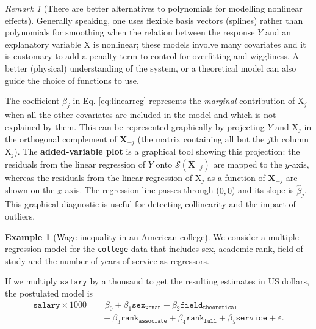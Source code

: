 \documentclass[
  11pt,
  letterpaper,
]{book}
\theoremstyle{definition}
\theoremstyle{definition}
\newtheorem{example}{Example}[chapter]
\theoremstyle{definition}
\theoremstyle{remark}
\newtheorem*{remark}{Remark}
\begin{document}
\begin{remark}[There are better alternatives to polynomials for modelling nonlinear effects]
{}Generally speaking, one uses flexible basis vectors (splines) rather than polynomials for smoothing when the relation between the response \(Y\) and an explanatory variable \(\mathrm{X}\) is nonlinear; these models involve many covariates and it is customary to add a penalty term to control for overfitting and wiggliness. A better (physical) understanding of the system, or a theoretical model can also guide the choice of functions to use.
\end{remark}

The coefficient \(\beta_j\) in Eq. \eqref{eq:linearreg} represents the \emph{marginal} contribution of \(\mathrm{X}_j\) when all the other covariates are included in the model and which is not explained by them. This can be represented graphically by projecting \(Y\) and \(\mathrm{X}_j\) in the orthogonal complement of \(\mathbf{X}_{-j}\) (the matrix containing all but the \(j\)th column \(\mathrm{X}_j\)). The \textbf{added-variable plot} is a graphical tool showing this projection: the residuals from the linear regression of \(Y\) onto \(\mathscr{S}(\mathbf{X}_{-j})\) are mapped to the \(y\)-axis, whereas the residuals from the linear regression of \(\mathrm{X}_j\) as a function of \(\mathbf{X}_{-j}\) are shown on the \(x\)-axis. The regression line passes through (\(0,0\)) and its slope is \(\hat{\beta}_j\). This graphical diagnostic is useful for detecting collinearity and the impact of outliers.

\begin{example}[Wage inequality in an American college]
\protect\hypertarget{exm:inequite-salariale}{}{\label{exm:inequite-salariale} {} }We consider a multiple regression model for the \texttt{college} data that includes sex, academic rank, field of study and the number of years of service as regressors.
\end{example}

If we multiply \(\texttt{salary}\) by a thousand to get the resulting estimates in US dollars, the postulated model is
\begin{align*}
\texttt{salary}\times 1000 &= \beta_0 + \beta_1 \texttt{sex}_{\texttt{woman}} +\beta_2 \texttt{field}_{\texttt{theoretical}} \\&\quad +\beta_3 \texttt{rank}_{\texttt{associate}}
+\beta_4 \texttt{rank}_{\texttt{full}}  +\beta_5 \texttt{service} + \varepsilon.
\end{align*}
\end{document}

